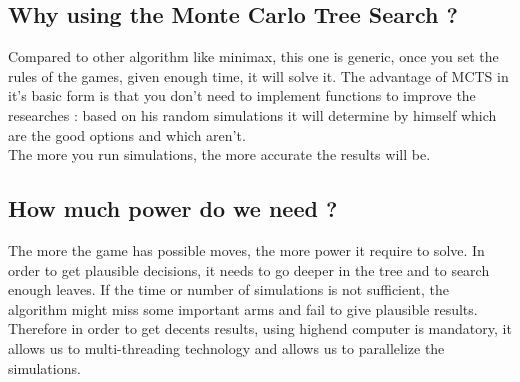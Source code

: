 \documentclass[12pt]{article}
\begin{document}
\subsection{Why using the Monte Carlo Tree Search ?}
Compared to other algorithm like minimax, this one is generic, once you set the rules of the games, given enough time, it will solve it. The advantage of MCTS in it's basic form is that you 	don't need to implement functions to improve the researches : based on his random simulations it will determine by himself which are the good options and which aren't.\\ The more you run simulations, the more accurate the results will be.

\subsection{How much power do we need ?}
The more the game has possible moves, the more power it require to solve. In order to get plausible decisions, it needs to go deeper in the tree and to search enough leaves. If the time or number of simulations is not sufficient, the algorithm might miss some important arms and fail to give plausible results. Therefore in order to get decents results, using highend computer is mandatory, it allows us to multi-threading technology and allows us to parallelize the simulations.
\end{document}
